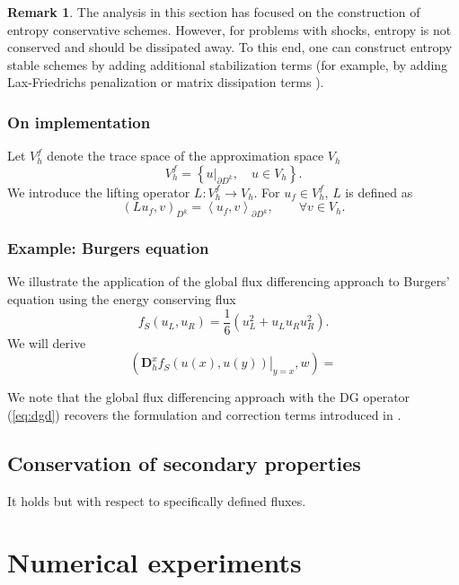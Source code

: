 \documentclass[preprint,10pt]{article}
\theoremstyle{definition}
\theoremstyle{lemma}
\newtheorem*{remark}{Remark}
\theoremstyle{theorem}
\newcommand{\LRp}[1]{\left( #1 \right)}
\newcommand{\LRa}[1]{\left\langle #1 \right\rangle}
\newcommand{\LRc}[1]{\left\{ #1 \right\}}
\newcommand{\note}[1]{{\color{blue}{#1}}}
\begin{document}
\begin{remark}
The analysis in this section has focused on the construction of entropy conservative schemes.  However, for problems with shocks, entropy is not conserved and should be dissipated away.  To this end, one can construct entropy stable schemes by adding additional stabilization terms (for example, by adding Lax-Friedrichs penalization or matrix dissipation terms \cite{chandrashekar2013kinetic,winters2017uniquely}).  
\end{remark}

\subsubsection{On implementation}

Let $V_h^f$ denote the trace space of the approximation space $V_h$ 
\[
V_h^f = \LRc{ \left.u\right|_{\partial D^k}, \quad u \in V_h}.  
\]
We introduce the lifting operator ${L}: V_h^f\rightarrow V_h$.  For $u_f \in V^f_h$, ${L}$ is defined as 
\[
\LRp{{L} u_f,v}_{D^k} = \LRa{u_f,v}_{\partial D^k}, \qquad \forall v\in V_h.
\]

\subsubsection{Example: Burgers equation}

We illustrate the application of the global flux differencing approach to Burgers' equation using the energy conserving flux
\[
f_S(u_L,u_R) = \frac{1}{6}\LRp{u_L^2 + u_Lu_R u_R^2}.  
\]
We will derive 
\[
\LRp{\left.\bm{D}^x_h f_S(u(x),u(y))\right|_{y=x}, w} = 
\]

We note that the global flux differencing approach with the DG operator (\ref{eq:dgd}) recovers the formulation and correction terms introduced in \cite{ranocha2017extended}.  

\subsection{Conservation of secondary properties}

It holds but with respect to specifically defined fluxes.  

\section{Numerical experiments}

\note{We illustrate the entropy conservation and accuracy of the proposed schemes for three equations.  These gradually increase in complexity.  }
\end{document}
